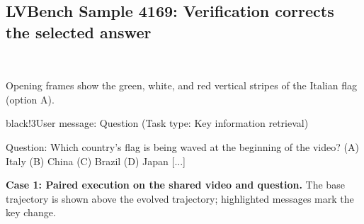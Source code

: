 
\subsection{LVBench Sample 4169: Verification corrects the selected answer}
\label{app:flag_case}

\begin{center}
\begin{VideoStrip}
\hbox{\hskip2pt
\hskip2pt
\hskip2pt
}
\end{VideoStrip}
\noindent{}\hspace{2pt}%
\hspace{2pt}%
\hspace{2pt}%
\par
\fontsize{8}{9.5}\selectfont Opening frames show the green, white, and red vertical stripes of the Italian flag (option A).
\end{center}

\begin{MessageBox}{black!3}{User message: Question (Task type: Key information retrieval)}
\begin{Trajectory}
[...] Question: Which country's flag is being waved at the beginning of the video?
(A) Italy  (B) China  (C) Brazil  (D) Japan [...]
\end{Trajectory}
\end{MessageBox}
\medskip
\noindent\textbf{Case 1: Paired execution on the shared video and question.}
The base trajectory is shown above the evolved trajectory; highlighted messages mark the key change.

